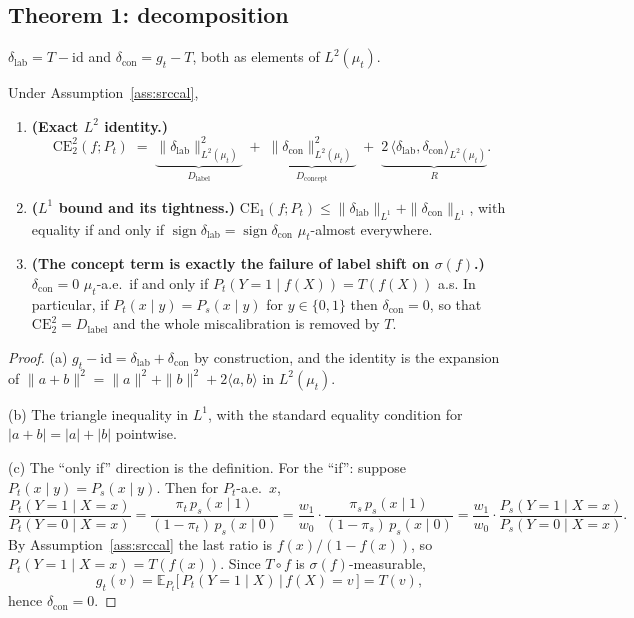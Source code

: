 \subsection{Theorem 1: decomposition}

\begin{definition}
$\delta_{\mathrm{lab}} = T-\mathrm{id}$ and
$\delta_{\mathrm{con}} = g_t-T$, both as elements of $L^2(\mu_t)$.
\end{definition}

\begin{theorem}[Decomposition]\label{thm:decomp}
Under Assumption~\ref{ass:srccal},
\begin{enumerate}[label=(\alph*)]
\item \textbf{(Exact $L^2$ identity.)}
\[
  \mathrm{CE}_2^2(f;P_t)
  \;=\;
  \underbrace{\|\delta_{\mathrm{lab}}\|^2_{L^2(\mu_t)}}_{D_{\mathrm{label}}}
  \;+\;
  \underbrace{\|\delta_{\mathrm{con}}\|^2_{L^2(\mu_t)}}_{D_{\mathrm{concept}}}
  \;+\;
  \underbrace{2\,\langle \delta_{\mathrm{lab}},\delta_{\mathrm{con}}\rangle_{L^2(\mu_t)}}_{R} .
\]
\item \textbf{($L^1$ bound and its tightness.)}
$\mathrm{CE}_1(f;P_t)\le \|\delta_{\mathrm{lab}}\|_{L^1}+\|\delta_{\mathrm{con}}\|_{L^1}$,
with equality if and only if
$\operatorname{sign}\delta_{\mathrm{lab}}=\operatorname{sign}\delta_{\mathrm{con}}$
$\mu_t$-almost everywhere.
\item \textbf{(The concept term is exactly the failure of label shift on
$\sigma(f)$.)}  $\delta_{\mathrm{con}}=0$ $\mu_t$-a.e.\ if and only if
$P_t(Y=1\mid f(X))=T(f(X))$ a.s.  In particular, if
$P_t(x\mid y)=P_s(x\mid y)$ for $y\in\{0,1\}$ then $\delta_{\mathrm{con}}=0$,
so that $\mathrm{CE}_2^2 = D_{\mathrm{label}}$ and the whole miscalibration is
removed by $T$.
\end{enumerate}
\end{theorem}

\begin{proof}
(a) $g_t-\mathrm{id}=\delta_{\mathrm{lab}}+\delta_{\mathrm{con}}$ by
construction, and the identity is the expansion of
$\|a+b\|^2=\|a\|^2+\|b\|^2+2\langle a,b\rangle$ in $L^2(\mu_t)$.

(b) The triangle inequality in $L^1$, with the standard equality condition for
$|a+b|=|a|+|b|$ pointwise.

(c) The ``only if'' direction is the definition.  For the ``if'': suppose
$P_t(x\mid y)=P_s(x\mid y)$.  Then for $P_t$-a.e.\ $x$,
\[
  \frac{P_t(Y=1\mid X=x)}{P_t(Y=0\mid X=x)}
  =\frac{\pi_t\,p_s(x\mid 1)}{(1-\pi_t)\,p_s(x\mid 0)}
  =\frac{w_1}{w_0}\cdot\frac{\pi_s\,p_s(x\mid 1)}{(1-\pi_s)\,p_s(x\mid 0)}
  =\frac{w_1}{w_0}\cdot\frac{P_s(Y=1\mid X=x)}{P_s(Y=0\mid X=x)} .
\]
By Assumption~\ref{ass:srccal} the last ratio is $f(x)/(1-f(x))$, so
$P_t(Y=1\mid X=x)=T(f(x))$.  Since $T\circ f$ is $\sigma(f)$-measurable,
\[
  g_t(v)=\mathbb{E}_{P_t}\big[\,P_t(Y=1\mid X)\,\big|\,f(X)=v\,\big]=T(v),
\]
hence $\delta_{\mathrm{con}}=0$.
\end{proof}

